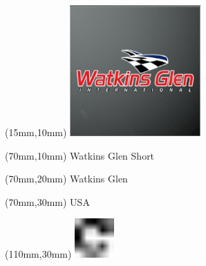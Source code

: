 \null\newpage
\begin{textblock*}{50mm}(15mm,10mm)%
\includegraphics[width=50mm]{LG/2015-05-20_00097.png}
\end{textblock*}
\begin{textblock*}{130mm}(70mm,10mm)%
{\fontsize{20}{20}\selectfont Watkins Glen Short}\\
\end{textblock*}
\begin{textblock*}{120mm}(70mm,20mm)%
{\fontsize{16}{16}\selectfont Watkins Glen}\\
\end{textblock*}
\begin{textblock*}{120mm}(70mm,30mm)%
{\fontsize{12}{12}\selectfont USA}
\end{textblock*}
\begin{textblock*}{30mm}(110mm,30mm)%
\centering
\includegraphics[height=15mm]{icons/fa-rotate-right.pdf}
\end{textblock*}
